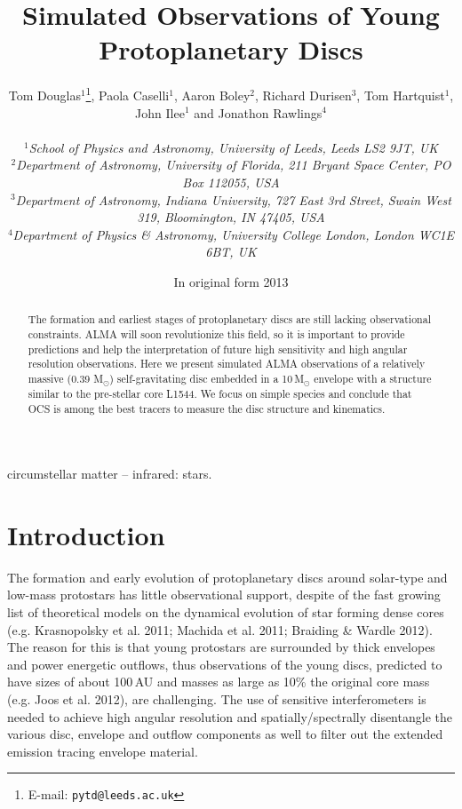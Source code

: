 \documentclass[useAMS,usenatbib]{mn2e}
\title[Young protoplanetary discs]{Simulated Observations of Young Protoplanetary Discs}
\author[T.~A.~Douglas et al.]
{\parbox{\textwidth}{Tom Douglas$^{1}$\thanks{E-mail: \texttt{pytd@leeds.ac.uk}},
Paola Caselli$^{1}$,
Aaron Boley$^{2}$,
Richard Durisen$^{3}$,
Tom Hartquist$^{1}$,
John Ilee$^{1}$ and
Jonathon Rawlings$^{4}$\\
\vspace{0.1cm}\\
{\small{\it$^{1}$School of Physics and Astronomy, University of Leeds, Leeds LS2 9JT, UK}} \\
{\small{\it$^{2}$Department of Astronomy, University of Florida, 211 Bryant Space Center, PO Box 112055, USA}}\\
{\small{\it$^{3}$Department of Astronomy, Indiana University, 727 East 3rd Street, Swain West 319, Bloomington, IN 47405, USA}}\\
{\small{\it$^{4}$Department of Physics \& Astronomy, University College London, London WC1E 6BT, UK}}\\}}
\begin{document}
\date{In original form 2013}

\pagerange{\pageref{firstpage}--\pageref{lastpage}} 

\maketitle

\label{firstpage}

\begin{abstract}
The formation and earliest stages of protoplanetary discs are still lacking observational constraints. ALMA will soon revolutionize this field, so it is important to provide predictions and help the interpretation of future high sensitivity and high angular resolution observations. Here we present simulated ALMA observations of a relatively massive (0.39 M$_{\odot}$) self-gravitating disc embedded in a 10\,M$_{\odot}$ envelope with a structure similar to the pre-stellar core L1544. We focus on simple species and conclude that OCS is among the best tracers to measure the disc structure and kinematics. 
\end{abstract}

\begin{keywords}
circumstellar matter -- infrared: stars.
\end{keywords}

\section{Introduction}

The formation and early evolution of protoplanetary discs around solar-type and low-mass protostars has little observational support, despite of the fast growing list of theoretical models on the dynamical evolution of star forming dense cores (e.g. Krasnopolsky et al. 2011; Machida et al. 2011; Braiding \& Wardle 2012). The reason for this is that young protostars are surrounded by thick envelopes and power energetic outflows, thus observations of the young discs, predicted to have sizes of about 100\,AU and masses as large as 10\% the original core mass (e.g. Joos et al. 2012), are challenging. The use of sensitive interferometers is needed to achieve high angular resolution and spatially/spectrally disentangle the various disc, envelope and outflow components as well to filter out the extended emission tracing envelope material. 
\end{document}
